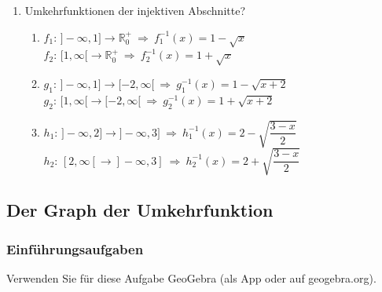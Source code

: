 \begin{enumerate}
    \item Umkehrfunktionen der injektiven Abschnitte?
          \begin{enumerate}
              \item $f_1:\,]-\infty,1]\to\mathbb{R}_0^{+}\ \Rightarrow\
                        f_1^{-1}(x)=1-\sqrt{x}$\\
                    $f_2:\,[1,\infty[\to\mathbb{R}_0^{+}\ \Rightarrow\
                        f_2^{-1}(x)=1+\sqrt{x}$
              \item $g_1:\,]-\infty,1]\to[-2,\infty[\ \Rightarrow\
                        g_1^{-1}(x)=1-\sqrt{x+2}$\\
                    $g_2:\,[1,\infty[\to[-2,\infty[\ \Rightarrow\
                        g_2^{-1}(x)=1+\sqrt{x+2}$
              \item $h_1:\,]-\infty,2]\to]-\infty,3]\ \Rightarrow\
                        h_1^{-1}(x)=2-\sqrt{\dfrac{3-x}{2}}$\\
                    $h_2:\,[2,\infty[\to]-\infty,3]\ \Rightarrow\
                        h_2^{-1}(x)=2+\sqrt{\dfrac{3-x}{2}}$
          \end{enumerate}
\end{enumerate}
\newpage
\subsection{Der Graph der Umkehrfunktion}
\subsubsection*{Einführungsaufgaben}
Verwenden Sie für diese Aufgabe GeoGebra (als App oder auf geogebra.org).

